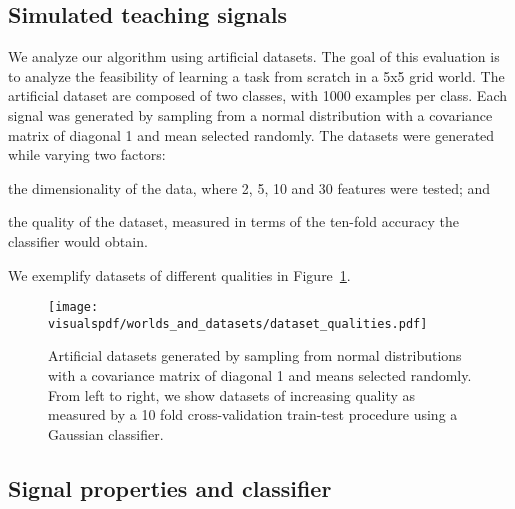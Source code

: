 \subsection{Simulated teaching signals}
\label{chapter:planning:artificialsignals}

We analyze our algorithm using artificial datasets. The goal of this evaluation is to analyze the feasibility of learning a task from scratch in a 5x5 grid world. The artificial dataset are composed of two classes, with 1000 examples per class. Each signal was generated by sampling from a normal distribution with a covariance matrix of diagonal 1 and mean selected randomly. The datasets were generated while varying two factors: \begin{inparaenum}[(i)] \item the dimensionality of the data, where 2, 5, 10 and 30 features were tested; and \item the quality of the dataset, measured in terms of the ten-fold accuracy the classifier would obtain. \end{inparaenum} We exemplify datasets of different qualities in Figure~\ref{fig:datasetsquality}.

\begin{figure}[!htbp]
  \centering
      \texttt{[image: \\visualspdf/worlds\_and\_datasets/dataset\_qualities.pdf]}
      \caption{Artificial datasets generated by sampling from normal distributions with a covariance matrix of diagonal 1 and means selected randomly. From left to right, we show datasets of increasing quality as measured by a 10 fold cross-validation train-test procedure using a Gaussian classifier.}
    \label{fig:datasetsquality}
\end{figure}

\subsection{Signal properties and classifier}


